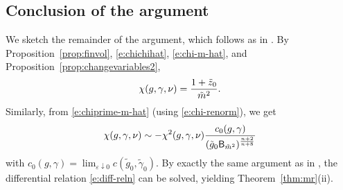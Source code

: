 
\subsection{Conclusion of the argument}
\label{sec:suscept-conc}

We sketch the remainder of the argument, which follows as in
\cite[Section~\ref{log-sec:chvar}]{BBS-saw4-log}.
By Proposition~\ref{prop:finvol}, \eqref{e:chichihat}, \eqref{e:chi-m-hat},
and Proposition~\ref{prop:changevariables2},
\begin{equation}
\label{e:chi-renorm}
\chi(g, \gamma, \nu)
	=
\frac{1 + \tilde z_0}{\tilde m^2}.
\end{equation}
Similarly, from \eqref{e:chiprime-m-hat} (using \eqref{e:chi-renorm}), we get
\begin{equation}
\label{e:diff-reln}
\chi(g, \gamma, \nu)
	\sim
-\chi^2(g, \gamma, \nu)
\frac{c_0(g, \gamma)}{(\tilde g_0 {\sf B}_{\tilde m^2})^{\frac{n+2}{n+8}}}
\end{equation}
with
$c_0(g, \gamma) = \lim_{\varepsilon\downarrow0} c(\tilde g_0, \tilde\gamma_0)$.
By exactly the same argument as in \cite[Section~\ref{log-sec:pfsuscept}]{BBS-saw4-log},
the differential relation \eqref{e:diff-reln}
can be solved, yielding Theorem~\ref{thm:mr}(ii).

